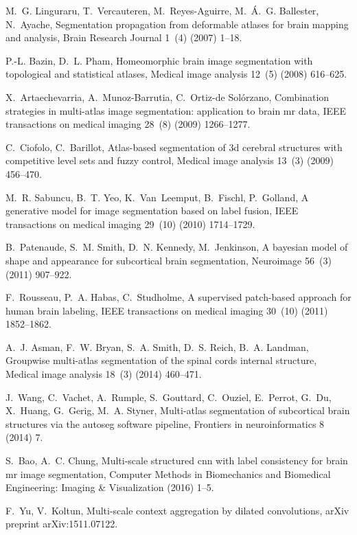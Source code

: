 \documentclass[twoside,fleqn,espcrc2]{elsarticle}
\begin{document}
\begin{thebibliography}{10}
M.~G. Linguraru, T.~Vercauteren, M.~Reyes-Aguirre, M.~{\'A}.~G. Ballester,
  N.~Ayache, Segmentation propagation from deformable atlases for brain mapping
  and analysis, Brain Research Journal 1~(4) (2007) 1--18.

P.-L. Bazin, D.~L. Pham, Homeomorphic brain image segmentation with topological
  and statistical atlases, Medical image analysis 12~(5) (2008) 616--625.

X.~Artaechevarria, A.~Munoz-Barrutia, C.~Ortiz-de Sol{\'o}rzano, Combination
  strategies in multi-atlas image segmentation: application to brain mr data,
  IEEE transactions on medical imaging 28~(8) (2009) 1266--1277.

C.~Ciofolo, C.~Barillot, Atlas-based segmentation of 3d cerebral structures
  with competitive level sets and fuzzy control, Medical image analysis 13~(3)
  (2009) 456--470.

M.~R. Sabuncu, B.~T. Yeo, K.~Van~Leemput, B.~Fischl, P.~Golland, A generative
  model for image segmentation based on label fusion, IEEE transactions on
  medical imaging 29~(10) (2010) 1714--1729.

B.~Patenaude, S.~M. Smith, D.~N. Kennedy, M.~Jenkinson, A bayesian model of
  shape and appearance for subcortical brain segmentation, Neuroimage 56~(3)
  (2011) 907--922.

F.~Rousseau, P.~A. Habas, C.~Studholme, A supervised patch-based approach for
  human brain labeling, IEEE transactions on medical imaging 30~(10) (2011)
  1852--1862.

A.~J. Asman, F.~W. Bryan, S.~A. Smith, D.~S. Reich, B.~A. Landman, Groupwise
  multi-atlas segmentation of the spinal cords internal structure, Medical
  image analysis 18~(3) (2014) 460--471.

J.~Wang, C.~Vachet, A.~Rumple, S.~Gouttard, C.~Ouziel, E.~Perrot, G.~Du,
  X.~Huang, G.~Gerig, M.~A. Styner, Multi-atlas segmentation of subcortical
  brain structures via the autoseg software pipeline, Frontiers in
  neuroinformatics 8 (2014) 7.

S.~Bao, A.~C. Chung, Multi-scale structured cnn with label consistency for
  brain mr image segmentation, Computer Methods in Biomechanics and Biomedical
  Engineering: Imaging \& Visualization (2016) 1--5.

F.~Yu, V.~Koltun, Multi-scale context aggregation by dilated convolutions,
  arXiv preprint arXiv:1511.07122.

\end{thebibliography}
\end{document}
